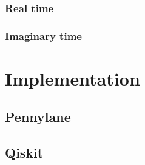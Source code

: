 \subsubsection{Real time}

\subsubsection{Imaginary time}

\section{Implementation}

\subsection{Pennylane}

\subsection{Qiskit}




